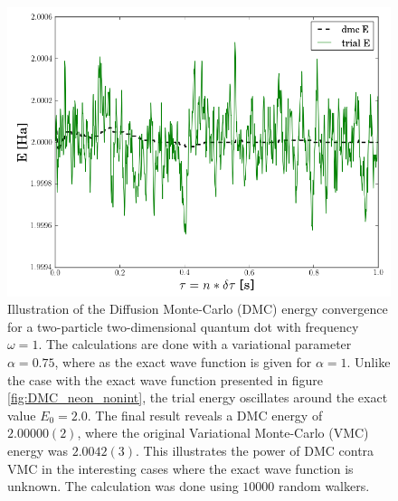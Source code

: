 \begin{figure}[h]
 \begin{center}
  \includegraphics[scale=0.5]{../Graphics/DMC_notExactWF.png}
  \caption{Illustration of the Diffusion Monte-Carlo (DMC) energy convergence for a two-particle two-dimensional quantum dot with frequency $\omega=1$. The calculations are done with a variational parameter $\alpha=0.75$, where as the exact wave function is given for $\alpha=1$. Unlike the case with the exact wave function presented in figure \ref{fig:DMC_neon_nonint}, the trial energy oscillates around the exact value $E_0 = 2.0$. The final result reveals a DMC energy of $2.00000(2)$, where the original Variational Monte-Carlo (VMC) energy was $2.0042(3)$. This illustrates the power of DMC contra VMC in the interesting cases where the exact wave function is unknown. The calculation was done using $10000$ random walkers.}
  \label{fig:DMC_nonExactWF}
 \end{center}
\end{figure}